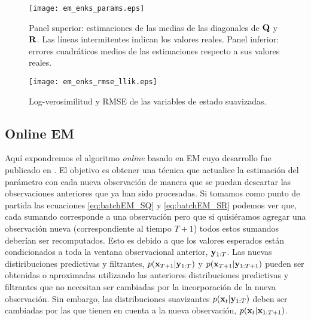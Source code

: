 \begin{figure}[h]
    \centering
    \texttt{[image: em\_enks\_params.eps]}
    \caption{Panel superior: estimaciones de las medias de las diagonales de $\mathbf{Q}$ y $\mathbf{R}$. Las líneas intermitentes indican los valores reales. Panel inferior: errores cuadráticos medios de las estimaciones respecto a sus valores reales.}
    \label{fig:em_enks_params}
\end{figure}

\begin{figure}[h]
    \centering
    \texttt{[image: em\_enks\_rmse\_llik.eps]}
    \caption{Log-verosimilitud y RMSE de las variables de estado suavizadas.}
    \label{fig:em_enks_rmse_llik}
\end{figure}

\subsection{Online EM} \label{sec:onlineEM}

Aquí expondremos el algoritmo \textit{online} basado en EM cuyo desarrollo fue publicado en \cite{Cocucci2021}. El objetivo es obtener una técnica que actualice la estimación del parámetro con cada nueva observación de manera que se puedan descartar las observaciones anteriores que ya han sido procesadas. Si tomamos como punto de partida las ecuaciones \ref{eq:batchEM_SQ} y \ref{eq:batchEM_SR} podemos ver que, cada sumando corresponde a una observación pero que si quisiéramos agregar una observación nueva (correspondiente al tiempo $T+1$) todos estos sumandos deberían ser recomputados. Esto es debido a que los valores esperados están condicionados a toda la ventana observacional anterior, $\mathbf{y}_{1:T}$. Las nuevas distiribuciones predictivas y filtrantes, $p(\mathbf{x}_{T+1} | \mathbf{y}_{1:T})$ y $p(\mathbf{x}_{T+1} | \mathbf{y}_{1:T+1})$ pueden ser obtenidas o aproximadas utilizando las anteriores distribuciones predictivas y filtrantes que no necesitan ser cambiadas por la incorporación de la nueva observación. Sin embargo, las distribuciones suavizantes $p(\mathbf{x}_t | \mathbf{y}_{1:T})$ deben ser cambiadas por las que tienen en cuenta a la nueva observación, $p(\mathbf{x}_t | \mathbf{x}_{1:T+1})$.

